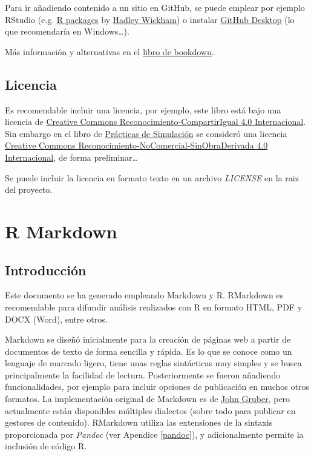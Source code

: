 \documentclass[]{book}
\theoremstyle{definition}
\theoremstyle{definition}
\theoremstyle{definition}
\theoremstyle{remark}
\begin{document}
Para ir añadiendo contenido a un sitio en GitHub, se puede emplear por
ejemplo RStudio (e.g. \href{http://r-pkgs.had.co.nz/git.html}{R
packages} by \href{http://hadley.nz/\#code}{Hadley Wickham}) o instalar
\href{https://desktop.github.com}{GitHub Desktop} (lo que recomendaría
en Windows\ldots{}).

Más información y alternativas en el
\href{https://bookdown.org/yihui/bookdown/publishing.html}{libro de
bookdown}.

\section{Licencia}\label{licencia}

Es recomendable incluir una licencia, por ejemplo, este libro está bajo
una licencia de
\href{https://creativecommons.org/licenses/by-sa/4.0/deed.es}{Creative
Commons Reconocimiento-CompartirIgual 4.0 Internacional}. Sin embargo en
el libro de \href{https://rubenfcasal.github.io/simbook}{Prácticas de
Simulación} se consideró una licencia
\href{https://creativecommons.org/licenses/by-nc-nd/4.0/deed.es_ES}{Creative
Commons Reconocimiento-NoComercial-SinObraDerivada 4.0 Internacional},
de forma preliminar\ldots{}

Se puede incluir la licencia en formato texto en un archivo
\emph{LICENSE} en la raiz del proyecto.

\appendix


\chapter{R Markdown}\label{rmarkdown}

\section{Introducción}\label{introduccion-1}

Este documento se ha generado empleando Markdown y R. RMarkdown es
recomendable para difundir análisis realizados con R en formato HTML,
PDF y DOCX (Word), entre otros.

Markdown se diseñó inicialmente para la creación de páginas web a partir
de documentos de texto de forma sencilla y rápida. Es lo que se conoce
como un lenguaje de marcado ligero, tiene unas reglas sintácticas muy
simples y se busca principalmente la facilidad de lectura.
Posteriormente se fueron añadiendo funcionalidades, por ejemplo para
incluir opciones de publicación en muchos otros formatos. La
implementación original de Markdown es de
\href{http://daringfireball.net/projects/markdown/}{John Gruber}, pero
actualmente están disponibles múltiples dialectos (sobre todo para
publicar en gestores de contenido). RMarkdown utiliza las extensiones de
la sintaxis proporcionada por \emph{Pandoc} (ver Apendice \ref{pandoc}),
y adicionalmente permite la inclusión de código R.
\end{document}
